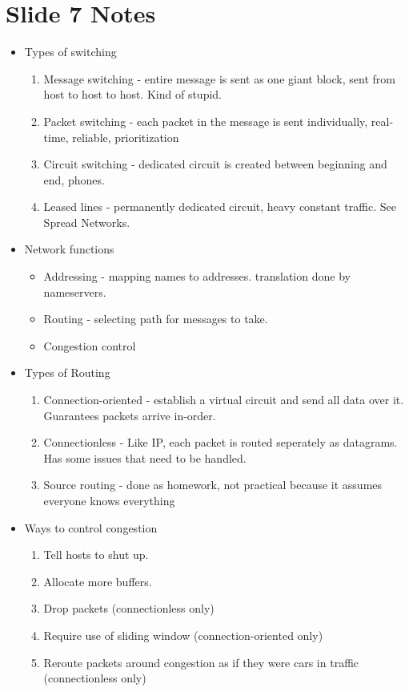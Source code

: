 \documentclass{scrartcl}
\begin{document}
\section*{Slide 7 Notes}
\begin{itemize}
\item Types of switching
\begin{enumerate}
\item Message switching - entire message is sent as one giant block, sent from
host to host to host. Kind of stupid.
\item Packet switching - each packet in the message is sent individually,
real-time, reliable, prioritization
\item Circuit switching - dedicated circuit is created between beginning and
end, phones.
\item Leased lines - permanently dedicated circuit, heavy constant traffic.
See Spread Networks.
\end{enumerate}
\item Network functions
\begin{itemize}
\item Addressing - mapping names to addresses. translation done by nameservers.
\item Routing - selecting path for messages to take.
\item Congestion control
\end{itemize}
\item Types of Routing
\begin{enumerate}
\item Connection-oriented - establish a virtual circuit and send all data over
it. Guarantees packets arrive in-order.
\item Connectionless - Like IP, each packet is routed seperately as datagrams.
 Has some issues that need to be handled.
\item Source routing - done as homework, not practical because it assumes
everyone knows everything
\end{enumerate}
\item Ways to control congestion
\begin{enumerate}
\item Tell hosts to shut up.
\item Allocate more buffers.
\item Drop packets (connectionless only)
\item Require use of sliding window (connection-oriented only)
\item Reroute packets around congestion as if they were cars in traffic
(connectionless only)
\end{enumerate}
\end{itemize}
\end{document}
